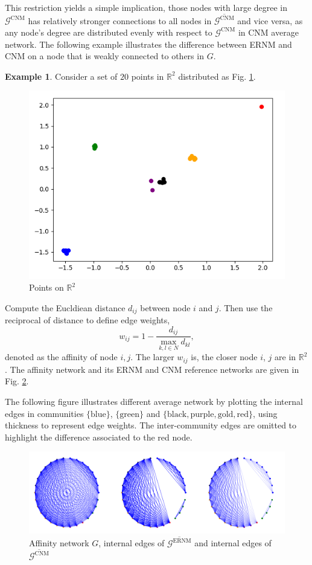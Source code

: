 \documentclass[11pt]{article}
\theoremstyle{definition}
\theoremstyle{definition}
\newtheorem{eg}{Example}
\theoremstyle{definition}
\theoremstyle{remark}
\theoremstyle{plain}
\begin{document}
This restriction yields a simple implication, those nodes with large degree in $\mathcal{G}^{\text{CNM}}$ has relatively stronger connections to all nodes in $\overline{\mathcal{G}^{\text{CNM}}}$ and vice versa, as any node's degree are distributed evenly with respect to $\mathcal{G}^{\text{CNM}}$ in CNM average network. The following example illustrates the difference between ERNM and CNM on a node that is weakly connected to others in $G$.

\begin{eg}\label{eg:ERNM-CNM}
	Consider a set of $20$ points in $\mathbb{R}^2$ distributed as Fig. \ref{fig:pts-in-R2}. 

	\begin{figure}[!h]
		\centering
		\includegraphics*[width=.6\textwidth]{points.png}
		\caption{Points on $\mathbb{R}^2$}
		\label{fig:pts-in-R2}
	\end{figure}

	Compute the Eucldiean distance $d_{ij}$ between node $i$ and $j$. Then use the reciprocal of distance to define edge weights,
	\[
		w_{ij} = 1 - \frac{d_{ij}}{\max_{k,l\in N}d_{kl}},
	\]
	denoted as the affinity of node $i,j$. The larger $w_{ij}$ is, the closer node $i$, $j$ are in $\mathbb{R}^2$. The affinity network and its ERNM and CNM reference networks are given in Fig. \ref{fig:affinity-network-reference-network}.

	The following figure illustrates different average network by plotting the internal edges in communities $\{\text{blue}\}$, $\{\text{green}\}$ and $\{\text{black}, \text{purple}, \text{gold}, \text{red}\}$, using thickness to represent edge weights. The inter-community edges are omitted to highlight the difference associated to the red node.

	\begin{figure}[!h]
		\centering
		\includegraphics*[width=.8\textwidth]{affinity.png}
		\caption{Affinity network $G$, internal edges of $\overline{\mathcal{G}^{\text{ERNM}}}$ and internal edges of $\overline{\mathcal{G}^{\text{CNM}}}$}
		\label{fig:affinity-network-reference-network}
	\end{figure}


\end{eg}
\end{document}
